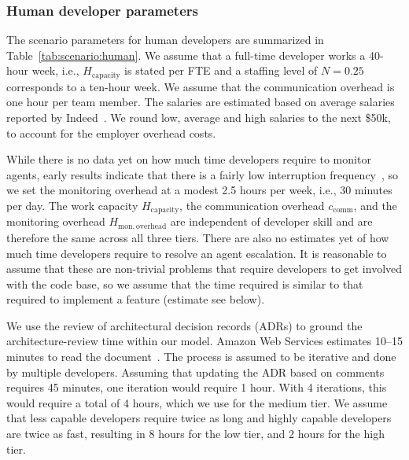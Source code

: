 \documentclass[smallextended]{svjour3}       %
\begin{document}
\subsubsection{Human developer parameters}

The scenario parameters for human developers are summarized in Table~\ref{tab:scenario:human}.
We assume that a full-time developer works a 40-hour week, i.e., $H_\mathrm{capacity}$ is stated per FTE and a staffing level of $N=0.25$ corresponds to a ten-hour week. We assume that the communication overhead is one hour per team member. The salaries are estimated based on average salaries reported by Indeed~\citep{indeed2026salaries}. We round low, average and high salaries to the next \$50k, to account for the employer overhead costs.

While there is no data yet on how much time developers require to monitor agents, early results indicate that there is a fairly low interruption frequency~\citep{baumann2026swechat}, so we set the monitoring overhead at a modest 2.5 hours per week, i.e., 30 minutes per day. The work capacity $H_\mathrm{capacity}$, the communication overhead $c_\mathrm{comm}$, and the monitoring overhead $H_\mathrm{mon,overhead}$ are independent of developer skill and are therefore the same across all three tiers. There are also no estimates yet of how much time developers require to resolve an agent escalation. It is reasonable to assume that these are non-trivial problems that require developers to get involved with the code base, so we assume that the time required is similar to that required to implement a feature (estimate see below).

We use the review of architectural decision records (ADRs) to ground the architecture-review time within our model. Amazon Web Services estimates 10--15 minutes to read the document~\citep{amazonArchitecturalDecision}. The process is assumed to be iterative and done by multiple developers. Assuming that updating the ADR based on comments requires 45 minutes, one iteration would require 1 hour. With 4 iterations, this would require a total of 4 hours, which we use for the medium tier. We assume that less capable developers require twice as long and highly capable developers are twice as fast, resulting in 8 hours for the low tier, and 2 hours for the high tier.
\end{document}
